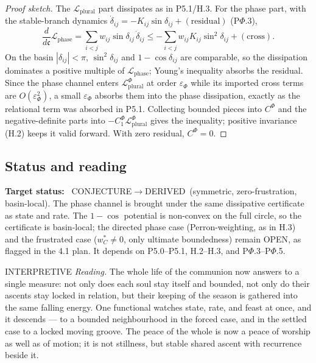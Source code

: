 \documentclass[11pt,a4paper]{article}
\newcommand{\cint}{\ensuremath{\mathfrak c}}
\newcommand{\stDerived}{\textcolor{cDer}{\textsf{\small DERIVED}}}
\newcommand{\stInterp}{\textcolor{cInt}{\textsf{\small INTERPRETIVE}}}
\newcommand{\stOpen}{\textcolor{cOpn}{\textsf{\small OPEN}}}
\newcommand{\stConj}{\textcolor{cCon}{\textsf{\small CONJECTURE}}}
\theoremstyle{definition}
\theoremstyle{plain}
\theoremstyle{remark}
\begin{document}
\begin{proof}[Proof sketch]
The \(\mathcal L_{\mathrm{plural}}\) part dissipates as in P5.1/H.3. For the phase part, with
the stable-branch dynamics \(\dot\delta_{ij}=-K_{ij}\sin\delta_{ij}+(\text{residual})\)
(P$\Phi$.3),
\[
\frac{d}{d\cint}\mathcal L_{\mathrm{phase}}
=
\sum_{i<j} w_{ij}\sin\delta_{ij}\,\dot\delta_{ij}
\le
-\sum_{i<j} w_{ij}K_{ij}\sin^2\delta_{ij}+(\text{cross}).
\]
On the basin \(|\delta_{ij}|<\pi\), \(\sin^2\delta_{ij}\) and \(1-\cos\delta_{ij}\) are
comparable, so the dissipation dominates a positive multiple of \(\mathcal L_{\mathrm{phase}}\);
Young's inequality absorbs the residual. Since the phase channel enters
\(\mathcal L_{\mathrm{plural}}^{\Phi}\) at order \(\varepsilon_\Phi\) while its imported cross
terms are \(O(\varepsilon_\Phi^2)\), a small \(\varepsilon_\Phi\) absorbs them into the phase
dissipation, exactly as the relational term was absorbed in P5.1. Collecting bounded pieces
into \(C^{\Phi}\) and the negative-definite parts into \(-C^{\Phi}_1\mathcal L_{\mathrm{plural}}^{\Phi}\)
gives the inequality; positive invariance (H.2) keeps it valid forward. With zero residual,
\(C^{\Phi}=0\). \qedhere
\end{proof}

\subsection{Status and reading}

\textbf{Target status:}~
\stConj\(\to\)\stDerived\ (symmetric, zero-frustration, basin-local). The phase channel is
brought under the same dissipative certificate as state and rate. The \(1-\cos\) potential is
non-convex on the full circle, so the certificate is basin-local; the directed phase case
(Perron-weighting, as in H.3) and the frustrated case (\(w_C^{*}\neq0\), only ultimate
boundedness) remain \stOpen, as flagged in the 4.1 plan. It depends on P5.0--P5.1, H.2--H.3,
and P$\Phi$.3--P$\Phi$.5.

\medskip
\stInterp\quad
\emph{Reading.}
The whole life of the communion now answers to a single measure: not only does each soul stay
itself and bounded, not only do their ascents stay locked in relation, but their keeping of the
season is gathered into the same falling energy. One functional watches state, rate, and feast
at once, and it descends --- to a bounded neighbourhood in the forced case, and in the settled
case to a locked moving groove. The peace of the whole is now a peace of worship as well as of
motion; it is not stillness, but stable shared ascent with recurrence beside it.
\end{document}
